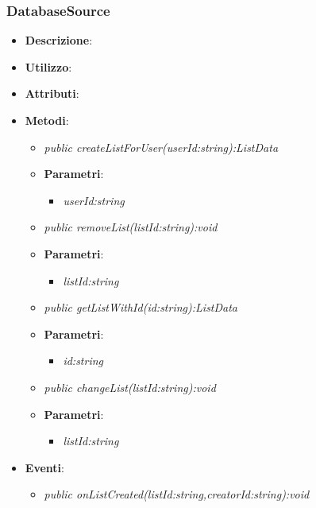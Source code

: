 \subsubsection{DatabaseSource}
\begin{itemize}
\item \textbf{Descrizione}: 
\item \textbf{Utilizzo}:
\item \textbf{Attributi}: 
\item \textbf{Metodi}:
	\begin{itemize}
	\item \textit{public createListForUser(userId:string):ListData}\\

			\item{\textbf{Parametri}: \begin{itemize}
			\item \textit{userId:string}\\

			\end{itemize}}
	\item \textit{public removeList(listId:string):void}\\

			\item{\textbf{Parametri}: \begin{itemize}
			\item \textit{listId:string}\\

			\end{itemize}}
	\item \textit{public getListWithId(id:string):ListData}\\

			\item{\textbf{Parametri}: \begin{itemize}
			\item \textit{id:string}\\

			\end{itemize}}
	\item \textit{public changeList(listId:string):void}\\

			\item{\textbf{Parametri}: \begin{itemize}
			\item \textit{listId:string}\\

			\end{itemize}}
	\end{itemize}
\item \textbf{Eventi}:
	\begin{itemize}
	\item \textit{public onListCreated(listId:string,creatorId:string):void}\\


\end{itemize}
\end{itemize}
